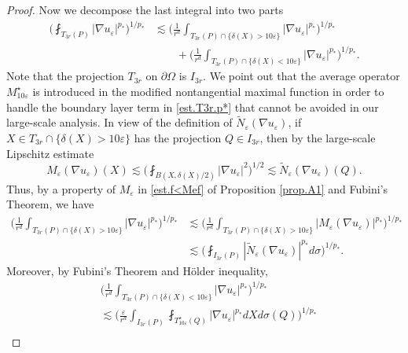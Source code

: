 \documentclass[reqno,12pt]{amsart} %
\theoremstyle{definition}
\theoremstyle{remark}
\numberwithin{equation}{section}
\newcommand{\e}{\varepsilon}
\begin{document}
\begin{proof}
Now we decompose the last integral into two parts
\begin{equation}
\begin{aligned}\label{est.T3r.p*}
    \bigg( \fint_{T_{3r}(P)} |\nabla u_\e|^{p_*} \bigg)^{1/p_*} & \lesssim \bigg( \frac{1}{r^d} \int_{T_{3r}(P) \cap \{ \delta(X) > 10\e \}} |\nabla u_\e|^{p_*} \bigg)^{1/p_*} \\
    & \qquad + \bigg( \frac{1}{r^d} \int_{T_{3r}(P) \cap \{ \delta(X) < 10\e \}} |\nabla u_\e|^{p_*} \bigg)^{1/p_*}.
    \end{aligned}
\end{equation}
Note that the projection $T_{3r}$ on $\partial \Omega$ is $I_{3r}$. We point out that the average operator $M_{10\e}^\star$ is introduced in the modified nontangential maximal function in order to handle the boundary layer term in \eqref{est.T3r.p*} that cannot be avoided in our large-scale analysis. In view of the definition of  $\widetilde{N}_\e(\nabla u_\e)$, if $X \in T_{3r} \cap \{ \delta(X) > 10\e \}$ has the projection $Q \in I_{3r}$, then by the large-scale Lipschitz estimate 
\begin{equation}
    M_\e(\nabla u_\e)(X) \lesssim \bigg( \fint_{B(X, \delta(X)/2)} |\nabla u_\e|^2 \bigg)^{1/2} \lesssim  \widetilde{N}_\e(\nabla u_\e)(Q).
\end{equation}
Thus, by a property of $M_\e$ in \eqref{est.f<Mef} of Proposition \ref{prop.A1} and Fubini's Theorem, we have
\begin{equation}\label{est.T3r.int}
\begin{aligned}
    \bigg( \frac{1}{r^d} \int_{T_{3r}(P) \cap \{ \delta(X) > 10\e \}} |\nabla u_\e|^{p_*} \bigg)^{1/p_*} & \lesssim \bigg( \frac{1}{r^d} \int_{T_{3r}(P) \cap \{ \delta(X) > 10\e \}} |M_\e(\nabla u_\e)|^{p_*} \bigg)^{1/p_*} \\
    & \lesssim \bigg( \fint_{I_{3r}(P)} |\widetilde{N}_\e(\nabla u_\e)|^{p_*} d\sigma \bigg)^{1/p_*}.
\end{aligned}
\end{equation}
Moreover, by Fubini's Theorem and H\"{o}lder inequality,
\begin{equation}\label{est.T3r.layer}
\begin{aligned}
    & \bigg( \frac{1}{r^d} \int_{T_{3r}(P) \cap \{ \delta(X) < 10\e \}} |\nabla u_\e|^{p_*} \bigg)^{1/p_*} \\
    & \lesssim \bigg( \frac{\e}{r^d} \int_{I_{3r}(P)} \fint_{T_{10\e}^\star(Q)} |\nabla u_\e|^{p_*} dX d\sigma(Q) \bigg)^{1/p_*} \\

\end{aligned}
\end{equation}
\end{proof}
\end{document}
